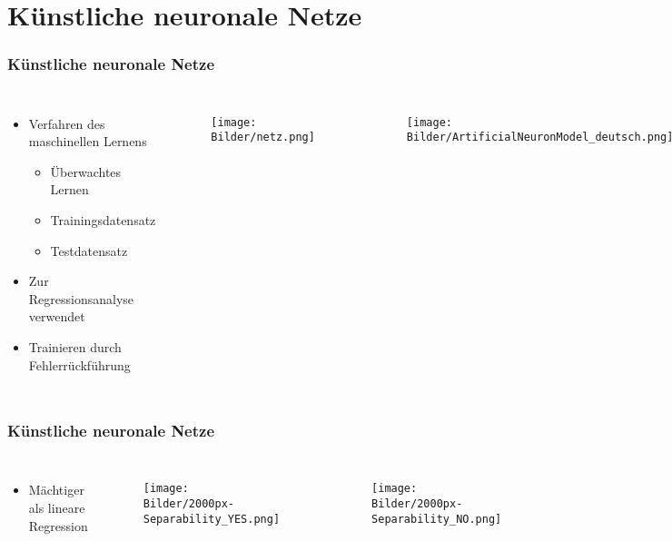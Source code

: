 \documentclass{beamer}
\begin{document}
\section{Künstliche neuronale Netze}
\begin{frame}
\frametitle{Künstliche neuronale Netze}
\begin{columns}
\begin{itemize}
	\item Verfahren des maschinellen Lernens
	\begin{itemize}
		\item Überwachtes Lernen
		\item Trainingsdatensatz
		\item Testdatensatz
	\end{itemize}
	\item Zur Regressionsanalyse verwendet
	\item Trainieren durch Fehlerrückführung
\end{itemize}

\begin{figure}
	\texttt{[image: Bilder/netz.png]}
\end{figure}

\begin{figure}
	\texttt{[image: Bilder/ArtificialNeuronModel\_deutsch.png]}
\end{figure}
\end{columns}
\end{frame}

\begin{frame}
\frametitle{Künstliche neuronale Netze}
\begin{columns}
\begin{itemize}
	\item Mächtiger als lineare Regression
\end{itemize}

\begin{figure}
	\texttt{[image: Bilder/2000px-Separability\_YES.png]}
\end{figure}
\begin{figure}
	\texttt{[image: Bilder/2000px-Separability\_NO.png]}
\end{figure}
\end{columns}
\end{frame}
\end{document}
